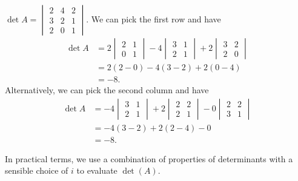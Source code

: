 \documentclass[a4paper]{article}
\begin{document}
\begin{eg}
  $\det A = \begin{vmatrix}2 & 4 & 2\\ 3 & 2 & 1\\ 2 & 0 & 1\end{vmatrix}$. We can pick the first row and have
  \begin{align*}
    \det A&= 2\begin{vmatrix}2 & 1\\0 & 1 \end{vmatrix} - 4\begin{vmatrix} 3 & 1\\ 2 & 1\end{vmatrix} + 2\begin{vmatrix}3 & 2 \\ 2 & 0\end{vmatrix}\\
    &= 2(2 - 0) - 4(3 - 2) + 2(0 - 4)\\
    &= -8.
  \end{align*}
  Alternatively, we can pick the second column and have
  \begin{align*}
    \det A&= -4\begin{vmatrix}3 & 1\\2 & 1 \end{vmatrix} + 2\begin{vmatrix} 2 & 2\\ 2 & 1\end{vmatrix} - 0\begin{vmatrix}2 & 2 \\ 3 & 1\end{vmatrix}\\
    &= -4(3 - 2) + 2(2 - 4) - 0\\
    &= -8.
  \end{align*}
\end{eg}

In practical terms, we use a combination of properties of determinants with a sensible choice of $i$ to evaluate $\det(A)$.
\end{document}
